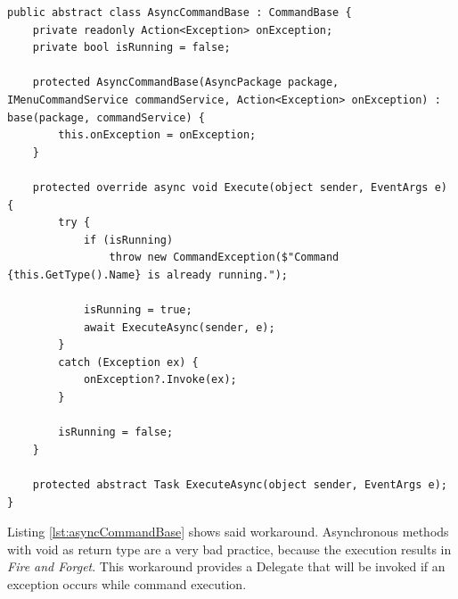 \begin{lstlisting}[style=CSharp, caption={Base class for async command handling}, label={lst:asyncCommandBase}]
public abstract class AsyncCommandBase : CommandBase {
	private readonly Action<Exception> onException;
	private bool isRunning = false;
	
	protected AsyncCommandBase(AsyncPackage package, IMenuCommandService commandService, Action<Exception> onException) : base(package, commandService) {
		this.onException = onException;
	}
	
	protected override async void Execute(object sender, EventArgs e) {
		try {
			if (isRunning)
				throw new CommandException($"Command {this.GetType().Name} is already running.");
			
			isRunning = true;
			await ExecuteAsync(sender, e);
		}
		catch (Exception ex) {
			onException?.Invoke(ex);
		}
		
		isRunning = false;
	}
	
	protected abstract Task ExecuteAsync(object sender, EventArgs e);
}
\end{lstlisting}
Listing \ref{lst:asyncCommandBase} shows said workaround. Asynchronous methods with void as return type are a very bad practice, because the execution results in \textit{Fire and Forget}. This workaround provides a Delegate that will be invoked if an exception occurs while command execution.

